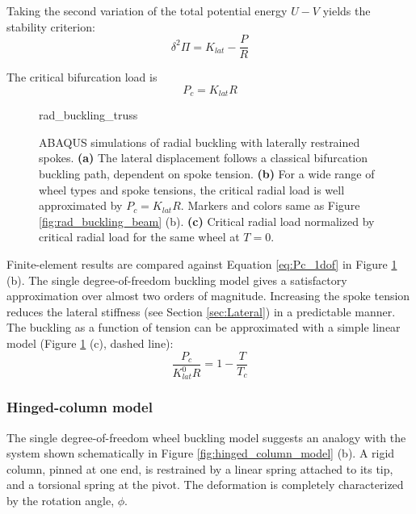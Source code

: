 \documentclass[\rootdir/thesis.tex]{subfiles}
\begin{document}
Taking the second variation of the total potential energy $U-V$ yields the stability criterion:
\begin{equation}
\label{eq:ddPi_1dof}
\delta^2 \Pi = K_{lat} - \frac{P}{R}
\end{equation}

The critical bifurcation load is
\begin{equation}
\label{eq:Pc_1dof}
P_c = K_{lat}R
\end{equation}

\begin{figure}[h]
\centering
{rad_buckling_truss} 
\caption{ABAQUS simulations of radial buckling with laterally restrained spokes. \textbf{(a)} The lateral displacement follows a classical bifurcation buckling path, dependent on spoke tension. \textbf{(b)} For a wide range of wheel types and spoke tensions, the critical radial load is well approximated by $P_c = K_{lat}R$. Markers and colors same as Figure \ref{fig:rad_buckling_beam} (b). \textbf{(c)} Critical radial load normalized by critical radial load for the same wheel at $T=0$.}
\label{fig:rad_buckling_truss}
\end{figure}

Finite-element results are compared against Equation \eqref{eq:Pc_1dof} in Figure \ref{fig:rad_buckling_truss} (b). The single degree-of-freedom buckling model gives a satisfactory approximation over almost two orders of magnitude. Increasing the spoke tension reduces the lateral stiffness (see Section \ref{sec:Lateral}) in a predictable manner. The buckling as a function of tension can be approximated with a simple linear model (Figure \ref{fig:rad_buckling_truss} (c), dashed line):
\begin{equation}
\label{eq:P_c_T}
\frac{P_c}{K_{lat}^0 R} = 1 - \frac{T}{T_c}
\end{equation}

\subsubsection{Hinged-column model}

The single degree-of-freedom wheel buckling model suggests an analogy with the system shown schematically in Figure \ref{fig:hinged_column_model} (b). A rigid column, pinned at one end, is restrained by a linear spring attached to its tip, and a torsional spring at the pivot. The deformation is completely characterized by the rotation angle, $\phi$.
\end{document}
